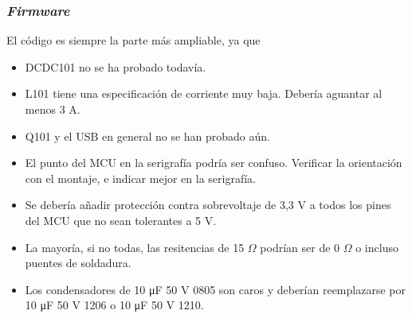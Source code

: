 \subsubsection{\textit{Firmware}}

El código es siempre la parte más ampliable, ya que 

\begin{itemize}
	\item DCDC101 no se ha probado todavía.
	\item L101 tiene una especificación de corriente muy baja. Debería aguantar al menos 3 A.
	\item Q101 y el USB en general no se han probado aún.
	\item El punto del MCU en la serigrafía podría ser confuso. Verificar la orientación con el montaje, e indicar mejor en la serigrafía.
	\item Se debería añadir protección contra sobrevoltaje de 3,3 V a todos los pines del MCU que no sean tolerantes a 5 V.
	\item La mayoría, si no todas, las resitencias de 15 $\Omega$ podrían ser de 0 $\Omega$ o incluso puentes de soldadura.
	\item Los condensadores de 10 \unit{\micro\farad} 50 V 0805 son caros y deberían reemplazarse por 10 \unit{\micro\farad} 50 V 1206 o 10 \unit{\micro\farad} 50 V 1210.
\end{itemize}